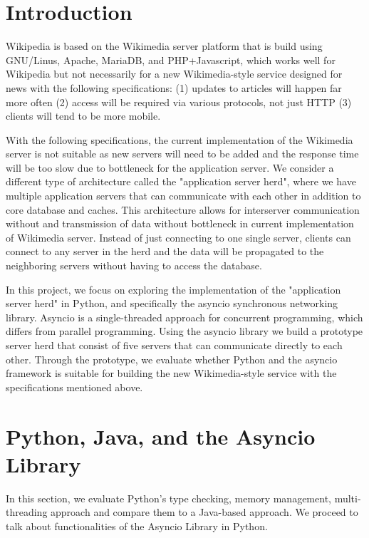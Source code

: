 \section{Introduction}
Wikipedia is based on the Wikimedia server platform that is build using GNU/Linus, Apache, MariaDB, and PHP+Javascript, which works well for Wikipedia but not necessarily for a new Wikimedia-style service designed for news with the following specifications:
(1) updates to articles will happen far more often (2) access will be required via various protocols, not just HTTP (3) clients will tend to be more mobile. \par
With the following specifications, the current implementation of the Wikimedia server is not suitable as new servers will need to be added and the response time will be too slow due to bottleneck for the application server. We consider a different type of architecture called the "application server herd", where we have multiple application servers that can communicate with each other in addition to core database and caches. This architecture allows for interserver communication without and transmission of data without bottleneck in current implementation of Wikimedia server. Instead of just connecting to one single server, clients can connect to any server in the herd and the data will be propagated to the neighboring servers without having to access the database.
\par
In this project, we focus on exploring the implementation of the "application server herd" in Python, and specifically the asyncio synchronous networking library. Asyncio is a single-threaded approach for concurrent programming, which differs from parallel programming. Using the asyncio library we build a prototype server herd that consist of five servers that can communicate directly to each other. Through the prototype, we evaluate whether Python and the asyncio framework is suitable for building the new Wikimedia-style service with the specifications mentioned above.

\section{Python, Java, and the Asyncio Library}
In this section, we evaluate Python's type checking, memory management, multi-threading approach and compare them to a Java-based approach. We proceed to talk about functionalities of the Asyncio Library in Python.
